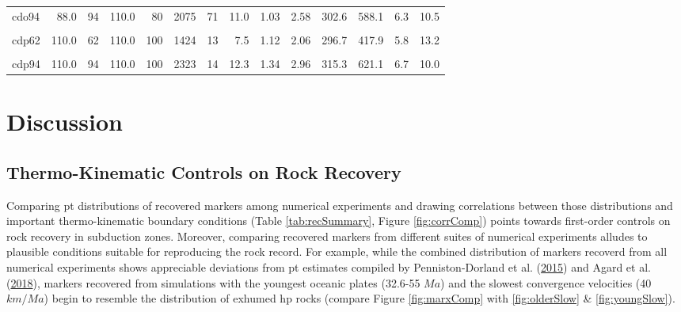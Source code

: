 \begin{landscape}
\begin{longtable}[t]{lrrrrrrrrrrrrr}
cdo94 & 88.0 & 94 & 110.0 & 80 & 2075 & 71 & 11.0 & 1.03 & 2.58 & 302.6 & 588.1 & 6.3 & 10.5\\
\cellcolor{gray!6}{cdp46} & \cellcolor{gray!6}{110.0} & \cellcolor{gray!6}{46} & \cellcolor{gray!6}{110.0} & \cellcolor{gray!6}{100} & \cellcolor{gray!6}{1522} & \cellcolor{gray!6}{81} & \cellcolor{gray!6}{8.1} & \cellcolor{gray!6}{1.27} & \cellcolor{gray!6}{1.63} & \cellcolor{gray!6}{477.9} & \cellcolor{gray!6}{477.9} & \cellcolor{gray!6}{10.3} & \cellcolor{gray!6}{11.1}\\
cdp62 & 110.0 & 62 & 110.0 & 100 & 1424 & 13 & 7.5 & 1.12 & 2.06 & 296.7 & 417.9 & 5.8 & 13.2\\
\cellcolor{gray!6}{cdp78} & \cellcolor{gray!6}{110.0} & \cellcolor{gray!6}{78} & \cellcolor{gray!6}{110.0} & \cellcolor{gray!6}{100} & \cellcolor{gray!6}{1813} & \cellcolor{gray!6}{16} & \cellcolor{gray!6}{9.6} & \cellcolor{gray!6}{1.11} & \cellcolor{gray!6}{1.88} & \cellcolor{gray!6}{333.8} & \cellcolor{gray!6}{476.7} & \cellcolor{gray!6}{7.3} & \cellcolor{gray!6}{7.4}\\
cdp94 & 110.0 & 94 & 110.0 & 100 & 2323 & 14 & 12.3 & 1.34 & 2.96 & 315.3 & 621.1 & 6.7 & 10.0\\*
\end{longtable}
\endgroup{}
\end{landscape}

\endgroup

\hypertarget{chpt4Discussion}{%
\section{Discussion}\label{chpt4Discussion}}

\hypertarget{thermo-kinematic-controls-on-rock-recovery}{%
\subsection{Thermo-Kinematic Controls on Rock Recovery}\label{thermo-kinematic-controls-on-rock-recovery}}

Comparing \gls{pt} distributions of recovered markers among numerical experiments and drawing correlations between those distributions and important thermo-kinematic boundary conditions (Table \ref{tab:recSummary}, Figure \ref{fig:corrComp}) points towards first-order controls on rock recovery in subduction zones. Moreover, comparing recovered markers from different suites of numerical experiments alludes to plausible conditions suitable for reproducing the rock record. For example, while the combined distribution of markers recoverd from all numerical experiments shows appreciable deviations from \gls{pt} estimates compiled by Penniston-Dorland et al. (\protect\hyperlink{ref-penniston2015}{2015}) and Agard et al. (\protect\hyperlink{ref-agard2018}{2018}), markers recovered from simulations with the youngest oceanic plates (32.6-55 \(Ma\)) and the slowest convergence velocities (40 \(km/Ma\)) begin to resemble the distribution of exhumed \gls{hp} rocks (compare Figure \ref{fig:marxComp} with \ref{fig:olderSlow} \& \ref{fig:youngSlow}).



